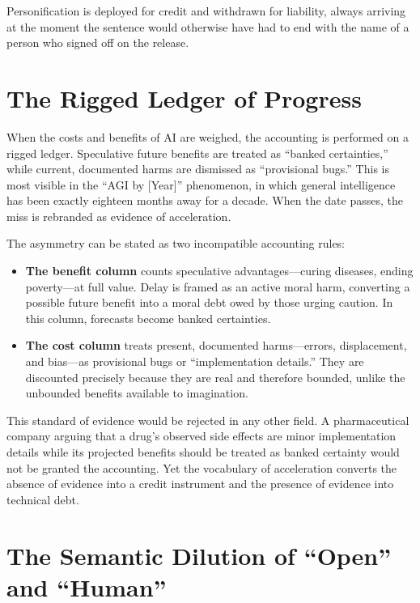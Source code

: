 \documentclass[11pt]{article}
\begin{document}
Personification is deployed for credit and withdrawn for liability, always arriving at the moment the sentence would otherwise have had to end with the name of a person who signed off on the release.

\section{The Rigged Ledger of Progress}

When the costs and benefits of AI are weighed, the accounting is performed on a rigged ledger. Speculative future benefits are treated as \enquote{banked certainties,} while current, documented harms are dismissed as \enquote{provisional bugs.} This is most visible in the \enquote{AGI by [Year]} phenomenon, in which general intelligence has been exactly eighteen months away for a decade. When the date passes, the miss is rebranded as evidence of acceleration.

The asymmetry can be stated as two incompatible accounting rules:

\begin{itemize}
  \item \textbf{The benefit column} counts speculative advantages---curing diseases, ending poverty---at full value. Delay is framed as an active moral harm, converting a possible future benefit into a moral debt owed by those urging caution. In this column, forecasts become banked certainties.
  \item \textbf{The cost column} treats present, documented harms---errors, displacement, and bias---as provisional bugs or \enquote{implementation details.} They are discounted precisely because they are real and therefore bounded, unlike the unbounded benefits available to imagination.
\end{itemize}

This standard of evidence would be rejected in any other field. A pharmaceutical company arguing that a drug's observed side effects are minor implementation details while its projected benefits should be treated as banked certainty would not be granted the accounting. Yet the vocabulary of acceleration converts the absence of evidence into a credit instrument and the presence of evidence into technical debt.

\section{The Semantic Dilution of \enquote{Open} and \enquote{Human}}
\end{document}
